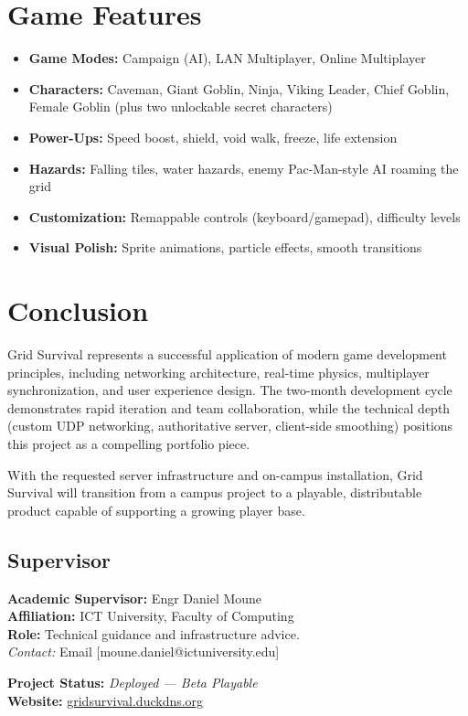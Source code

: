 \documentclass[12pt,a4paper]{article}
\begin{document}
\section{Game Features}

\begin{itemize}
    \item \textbf{Game Modes:} Campaign (AI), LAN Multiplayer, Online Multiplayer
    \item \textbf{Characters:} Caveman, Giant Goblin, Ninja, Viking Leader, Chief Goblin, Female Goblin (plus two unlockable secret characters)
    \item \textbf{Power-Ups:} Speed boost, shield, void walk, freeze, life extension
    \item \textbf{Hazards:} Falling tiles, water hazards, enemy Pac-Man-style AI roaming the grid
    \item \textbf{Customization:} Remappable controls (keyboard/gamepad), difficulty levels
    \item \textbf{Visual Polish:} Sprite animations, particle effects, smooth transitions
\end{itemize}

\section{Conclusion}

Grid Survival represents a successful application of modern game development principles, including networking architecture, real-time physics, multiplayer synchronization, and user experience design. The two-month development cycle demonstrates rapid iteration and team collaboration, while the technical depth (custom UDP networking, authoritative server, client-side smoothing) positions this project as a compelling portfolio piece.

With the requested server infrastructure and on-campus installation, Grid Survival will transition from a campus project to a playable, distributable product capable of supporting a growing player base.

\vspace{1cm}
\noindent

\subsection{Supervisor}

\textbf{Academic Supervisor:} Engr Daniel Moune \\
\textbf{Affiliation:} ICT University, Faculty of Computing \\
\textbf{Role:} Technical guidance and infrastructure advice. \\
\textit{Contact:} Email [moune.daniel@ictuniversity.edu]

\vspace{1cm}
\noindent
\textbf{Project Status:} \textit{Deployed — Beta Playable} \\
\textbf{Website:} \href{https://gridsurvival.duckdns.org}{gridsurvival.duckdns.org}
\end{document}
